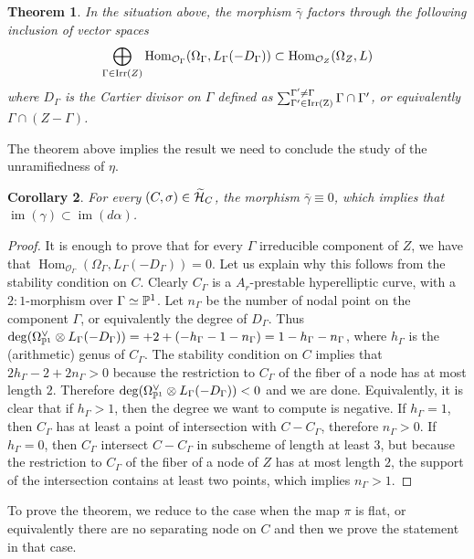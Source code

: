 \documentclass{alggeom}
\numberwithin{equation}{section}
\numberwithin{subsection}{section}
\newtheorem{theorem}{Theorem}[section]
\newtheorem{corollary}[theorem]{Corollary}
\theoremstyle{definition}
\theoremstyle{remark}
\newcommand\cO{\mathcal{O}} \newcommand\cP{\mathcal{P}}
\newcommand\im[1]{\operatorname{im}(#1)}
\renewcommand\hom{\operatorname{Hom}}
\newcommand{\Htilde}{\widetilde{\cH}}
\begin{document}
\begin{theorem}
	In the situation above, the morphism $\bar{\gamma}$ factors through the following inclusion of vector spaces
	$$ \bigoplus_{\Gamma \in {\rm Irr}(Z)}\hom_{\cO_{\Gamma}}(\Omega_{\Gamma},L_{\Gamma}(-D_{\Gamma}))\subset \hom_{\cO_Z}(\Omega_{Z},L)$$
where $D_{\Gamma}$ is the Cartier divisor on $\Gamma$ defined as $\sum^{\Gamma'\neq \Gamma}_{\Gamma' \in {\rm Irr(Z)}}\Gamma \cap \Gamma'$, or equivalently $\Gamma \cap (Z - \Gamma)$.
\end{theorem}
The theorem above implies the result we need to conclude the study of the unramifiedness of $\eta$.
\begin{corollary}
	For every $(C,\sigma) \in \Htilde_C$, the morphism $\bar{\gamma}\equiv 0$, which implies that $\im \gamma \subset \im{d\alpha}$. 
\end{corollary}

\begin{proof}
	It is enough to prove that for every $\Gamma$ irreducible component of $Z$, we have  that $\hom_{\cO_{\Gamma}}(\Omega_{\Gamma},L_{\Gamma}(-D_{\Gamma}))=0$. Let us explain why this follows from the stability condition on $C$. Clearly $C_{\Gamma}$ is a $A_r$-prestable hyperelliptic curve, with a $2:1$-morphism over $\Gamma\simeq \mathbb{P}^1$. Let $n_{\Gamma}$ be the number of nodal point on the component $\Gamma$, or equivalently the degree of $D_{\Gamma}$. Thus $\deg(\Omega_{\mathbb{P}^1}^{\vee} \otimes L_{\Gamma}(-D_{\Gamma}))=+2+(-h_{\Gamma}-1-n_{\Gamma})=1-h_{\Gamma}-n_{\Gamma}$, where $h_{\Gamma}$ is the  (arithmetic) genus of $C_{\Gamma}$. The stability condition on $C$ implies that $2h_{\Gamma}-2+2n_{\Gamma}>0$ because the restriction to $C_{\Gamma}$ of the fiber of a node has at most length $2$. Therefore $\deg (\Omega_{\mathbb{P}^1}^{\vee} \otimes L_{\Gamma}(-D_{\Gamma}))<0$ and we are done. Equivalently, it is clear that if $h_{\Gamma}>1$, then the degree we want to compute is negative. If $h_{\Gamma}=1$, then $C_{\Gamma}$ has at least a point of intersection with $C-C_{\Gamma}$, therefore $n_{\Gamma}>0$. If $h_{\Gamma}=0$, then $C_{\Gamma}$ intersect $C-C_{\Gamma}$ in subscheme of length at least $3$, but because the restriction to $C_{\Gamma}$ of the fiber of a node of $Z$ has at most length $2$, the support of the intersection contains at least two points, which implies $n_{\Gamma}>1$. 
\end{proof}
To prove the theorem, we reduce to the case when the map $\pi$ is flat, or equivalently there are no separating node on $C$ and then we prove the statement in that case.
\end{document}
